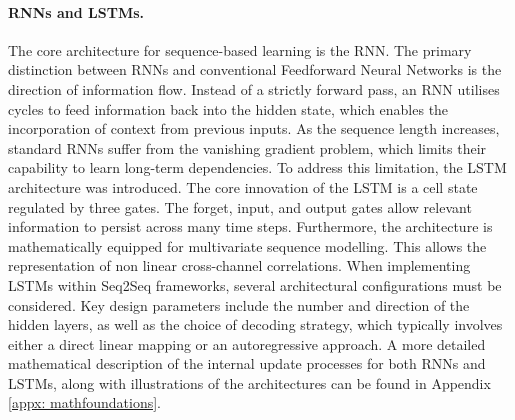 \paragraph{RNNs and LSTMs.}
The core architecture for sequence-based learning is the \ac{RNN}.
The primary distinction between \acp{RNN} and conventional Feedforward Neural Networks is the direction of information flow.
Instead of a strictly forward pass, an \ac{RNN} utilises cycles to feed information back into the hidden state, which enables the incorporation of context from previous inputs.
As the sequence length increases, standard \acp{RNN} suffer from the vanishing gradient problem, which limits their capability to learn long-term dependencies.
To address this limitation, the \ac{LSTM} architecture was introduced.
The core innovation of the \ac{LSTM} is a cell state regulated by three gates. The forget, input, and output gates allow relevant information to persist across many time steps.
Furthermore, the architecture is mathematically equipped for multivariate sequence modelling. This allows the representation of non linear cross-channel correlations.
When implementing \acp{LSTM} within \ac{Seq2Seq} frameworks, several architectural configurations must be considered. 
Key design parameters include the number and direction of the hidden layers, as well as the choice of decoding strategy, which typically involves either a direct linear mapping or an autoregressive approach.
A more detailed mathematical description of the internal update processes for both \acp{RNN} and \acp{LSTM}, along with illustrations of the architectures can be found in Appendix \ref{appx: mathfoundations}.

